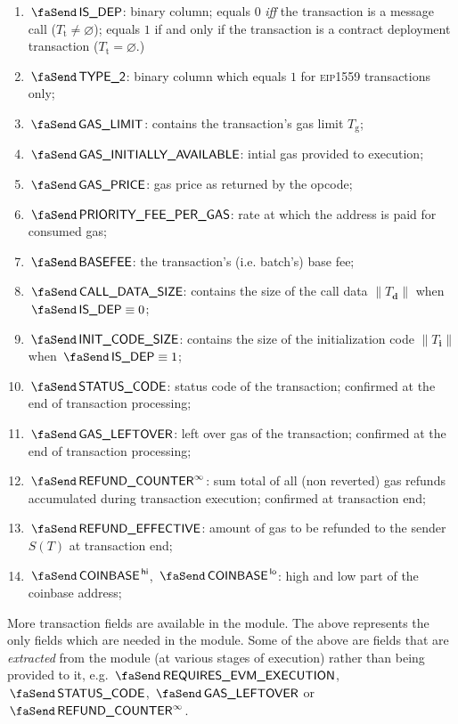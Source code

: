 \begin{enumerate}
	\item $\txIsDeployment$:
		\godGiven{}
		binary column; equals $0$ \emph{iff} the transaction is a message call ($T_\text{t} \neq \varnothing$); equals $1$ if and only if the transaction is a contract deployment transaction ($T_{\text{t}} = \varnothing$.)
	\item $\txIsTypeTwo$:
		\godGiven{}
		binary column which equals $1$ for \textsc{eip1559} transactions only;
	\item $\txGasLimit$:
		\godGiven{}
		contains the transaction's gas limit $T_\text{g}$;
	\item $\txInitialGas$:
		\godGiven{}
		intial gas provided to execution; 
	\item $\txGasPrice$:
		\godGiven{}
		gas price as returned by the  opcode;
	\item $\txPriorityFeePerGas$:
		\godGiven{}
		rate at which the  address is paid for consumed gas;
	\item $\txBasefee$:
		\godGiven{}
		the transaction's (i.e. batch's) base fee;
	\item $\txCallDataSize$:
		\godGiven{}
		contains the size of the call data $\|T_\textbf{d}\|$ when $\txIsDeployment \equiv 0$;
	\item $\txInitCodeSize$:
		\godGiven{}
		contains the size of the initialization code $\|T_\textbf{i}\|$ when $\txIsDeployment \equiv 1$;
	\item $\txStatusCode$:
		\markAsJustifiedHere{}
		\godGiven{}
		status code of the transaction; confirmed at the end of transaction processing; 
	\item $\txLeftoverGas$:
		\markAsJustifiedHere{}
		\godGiven{}
		left over gas of the transaction; confirmed at the end of transaction processing;
	\item $\txFinalRefundCounter$:
		\markAsJustifiedHere{}
		\godGiven{}
		sum total of all (non reverted) gas refunds accumulated during transaction execution; confirmed at transaction end; 
	\item $\txEffectiveRefund$:
		\godGiven{}
		amount of gas to be refunded to the sender $S(T)$ at transaction end;
	\item $\txCoinbase\high$, $\txCoinbase\low$:
		\godGiven{}
		high and low part of the coinbase address;
\end{enumerate}
\saNote{} More transaction fields are available in the \txnDataMod{} module. The above represents the only fields which are needed in the \hubMod{} module.
\saNote{} Some of the above are fields that are \emph{extracted} from the \hubMod{} module (at various stages of execution) rather than being provided to it, e.g.  $\txRequiresEvmExecution$, $\txStatusCode{}$, $\txLeftoverGas{}$ or $\txFinalRefundCounter{}$.
